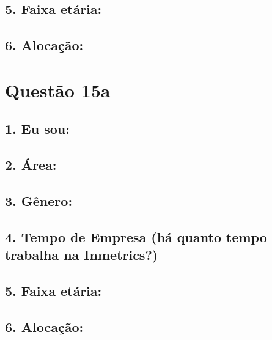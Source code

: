 \documentclass[]{book}
\begin{document}
\hypertarget{faixa-etaria-22}{%
\subsection{5. Faixa etária:}\label{faixa-etaria-22}}

\hypertarget{alocacao-22}{%
\subsection{6. Alocação:}\label{alocacao-22}}

\hypertarget{questao-15a}{%
\section{Questão 15a}\label{questao-15a}}

\hypertarget{eu-sou-23}{%
\subsection{1. Eu sou:}\label{eu-sou-23}}

\hypertarget{area-23}{%
\subsection{2. Área:}\label{area-23}}

\hypertarget{genero-23}{%
\subsection{3. Gênero:}\label{genero-23}}

\hypertarget{tempo-de-empresa-ha-quanto-tempo-trabalha-na-inmetrics-23}{%
\subsection{4. Tempo de Empresa (há quanto tempo trabalha na Inmetrics?)}\label{tempo-de-empresa-ha-quanto-tempo-trabalha-na-inmetrics-23}}

\hypertarget{faixa-etaria-23}{%
\subsection{5. Faixa etária:}\label{faixa-etaria-23}}

\hypertarget{alocacao-23}{%
\subsection{6. Alocação:}\label{alocacao-23}}
\end{document}
